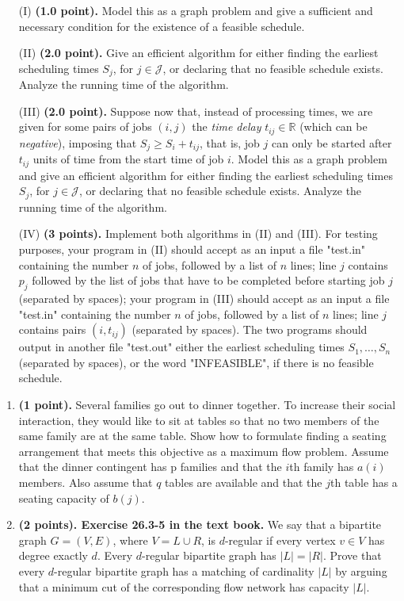 \documentclass{article}
\begin{document}
\begin{enumerate}
\item[(I)]  {\bf (1.0 point).} Model this as a graph problem and give
  a sufficient and necessary condition for the existence of a feasible
  schedule. 
\item[(II)]  {\bf (2.0 point).} Give an efficient algorithm for either
  finding the earliest scheduling times $S_j$, for $j\in\mathcal{J}$,
  or declaring that no feasible schedule exists. Analyze the running
  time of the algorithm. 
\item[(III)] {\bf (2.0 point).} Suppose now that, instead of
  processing times, we are given for some pairs of jobs $(i,j)$ the
  {\it time delay} $t_{ij}\in\mathbb{R}$ (which can be {\it
    negative}),  imposing that $S_j\ge S_i+t_{ij}$, that is, job $j$
  can only be started after $t_{ij}$ units of time from the start time
  of job $i$. Model this as a graph problem and give an efficient
  algorithm for either finding the earliest scheduling times $S_j$,
  for $j\in\mathcal{J}$, or declaring that no feasible schedule
  exists. Analyze the running time of the algorithm. 
\item[(IV)]  {\bf (3 points).} Implement both algorithms in (II) and
  (III). For testing purposes, your program in (II) should accept as
  an input a file "test.in" containing the number $n$ of jobs,
  followed by a list of $n$ lines; line $j$ contains $p_j$ followed by
  the list of jobs that have to be completed before starting job $j$
  (separated by spaces); your program in (III) should accept as an
  input a file "test.in" containing the number $n$ of jobs, followed
  by a list of $n$ lines; line $j$ contains pairs $(i,t_{ij})$
  (separated by spaces).  The two programs should output in another
  file "test.out" either the earliest scheduling times
  $S_1,\ldots,S_n$ (separated by spaces), or the word "INFEASIBLE", if
  there is no feasible schedule.  
\end{enumerate}

\medskip

\begin{enumerate}
\item {\bf (1 point).} Several families go out to dinner together. To
  increase their social interaction, they would like to sit at tables
  so that no two members of the same family are at the same
  table. Show how to formulate finding a seating arrangement that
  meets this objective as a maximum flow problem. Assume that the
  dinner contingent has p families and that the $i$th family has
  $a(i)$ members. Also assume that $q$ tables are available and that
  the $j$th table has a seating capacity of $b(j)$. 
\item {\bf (2 points). Exercise 26.3-5 in the text book.} We say that
  a bipartite graph $G=(V,E)$, where $V=L\cup R$, is $d$-regular if
  every vertex $v\in V$ has degree exactly $d$. Every $d$-regular
  bipartite graph has $|L| = |R|$. Prove that every $d$-regular
  bipartite graph has a matching of cardinality $|L|$ by arguing that
  a minimum cut of the corresponding flow network has capacity $|L|$.
\end{enumerate}
\end{document}

